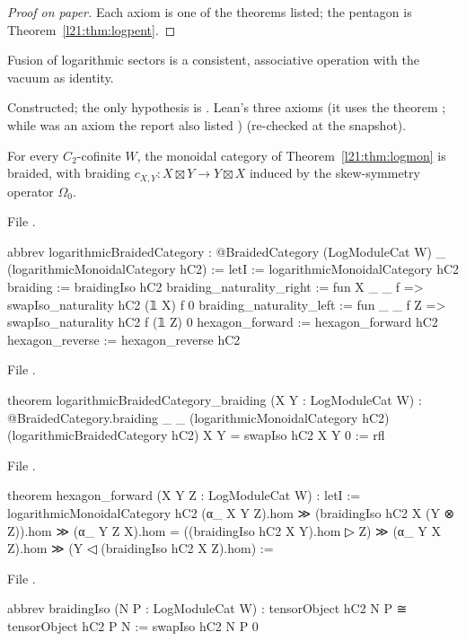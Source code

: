 \begin{proof}[Proof on paper]
Each axiom is one of the theorems listed; the pentagon is Theorem~\ref{l21:thm:logpent}.
\end{proof}

\begin{physics}
Fusion of logarithmic sectors is a consistent, associative operation with the vacuum as identity.
\end{physics}

\begin{status}
Constructed; the only hypothesis is . Lean's three axioms (it uses the theorem ; while  was an axiom the report also listed ) (re-checked at the snapshot).
\end{status}

\begin{theorem}\label{l21:thm:logbraid}
For every $C_2$-cofinite $W$, the monoidal category of Theorem~\ref{l21:thm:logmon} is braided, with braiding
$c_{X,Y}:X\boxtimes Y\to Y\boxtimes X$ induced by the skew-symmetry operator $\Omega_0$.
\end{theorem}
\noindent File .
\begin{leancode}
abbrev logarithmicBraidedCategory :
    @BraidedCategory (LogModuleCat W) _ (logarithmicMonoidalCategory hC2) :=
  letI := logarithmicMonoidalCategory hC2
  { braiding := braidingIso hC2
    braiding_naturality_right := fun X {_ _} f => swapIso_naturality hC2 (𝟙 X) f 0
    braiding_naturality_left := fun {_ _} f Z => swapIso_naturality hC2 f (𝟙 Z) 0
    hexagon_forward := hexagon_forward hC2
    hexagon_reverse := hexagon_reverse hC2 }
\end{leancode}
\noindent File .
\begin{leancode}
theorem logarithmicBraidedCategory_braiding (X Y : LogModuleCat W) :
    @BraidedCategory.braiding _ _ (logarithmicMonoidalCategory hC2)
      (logarithmicBraidedCategory hC2) X Y = swapIso hC2 X Y 0 := rfl
\end{leancode}
\noindent File .
\begin{leancode}
theorem hexagon_forward (X Y Z : LogModuleCat W) :
    letI := logarithmicMonoidalCategory hC2
    (α_ X Y Z).hom ≫ (braidingIso hC2 X (Y ⊗ Z)).hom ≫ (α_ Y Z X).hom =
      ((braidingIso hC2 X Y).hom ▷ Z) ≫ (α_ Y X Z).hom ≫ (Y ◁ (braidingIso hC2 X Z).hom) :=
\end{leancode}
\noindent File .
\begin{leancode}
abbrev braidingIso (N P : LogModuleCat W) : tensorObject hC2 N P ≅ tensorObject hC2 P N :=
  swapIso hC2 N P 0
\end{leancode}

